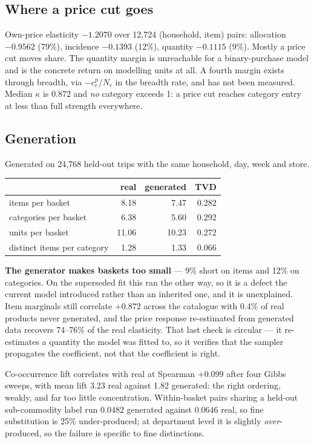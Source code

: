 \documentclass[11pt]{article}
\begin{document}
\subsection{Where a price cut goes}
\label{sec:decomp}

Own-price elasticity $-1.2070$ over 12{,}724 (household, item) pairs: allocation $-0.9562$
(79\%), incidence $-0.1393$ (12\%), quantity $-0.1115$ (9\%). Mostly a price cut moves
share. The quantity margin is unreachable for a binary-purchase model and is the concrete
return on modelling units at all. A fourth margin exists through breadth, via $-c^p_c/N_c$
in the breadth rate, and has not been measured. Median $\kappa$ is $0.872$ and \emph{no}
category exceeds 1: a price cut reaches category entry at less than full strength
everywhere.

\subsection{Generation}
\label{sec:gen}

Generated on 24{,}768 held-out trips with the same household, day, week and store.

\begin{center}
\begin{tabular}{lrrr}
\toprule
 & real & generated & TVD \\
\midrule
items per basket & 8.18 & 7.47 & 0.282 \\
categories per basket & 6.38 & 5.60 & 0.292 \\
units per basket & 11.06 & 10.23 & 0.272 \\
distinct items per category & 1.28 & 1.33 & 0.066 \\
\bottomrule
\end{tabular}
\end{center}

\textbf{The generator makes baskets too small} --- 9\% short on items and 12\% on categories.
On the superseded fit this ran the other way, so it is a defect the current model introduced
rather than an inherited one, and it is unexplained. Item marginals still correlate $+0.872$
across the catalogue with 0.4\% of real products never generated, and the price response
re-estimated from generated data recovers 74--76\% of the real elasticity. That last check is
circular --- it re-estimates a quantity the model was fitted to, so it verifies that the
sampler propagates the coefficient, not that the coefficient is right.

Co-occurrence lift correlates with real at Spearman $+0.099$ after four Gibbs sweeps, with
mean lift 3.23 real against 1.82 generated: the right ordering, weakly, and far too little
concentration. Within-basket pairs sharing a held-out sub-commodity label run $0.0482$
generated against $0.0646$ real, so fine substitution is 25\% under-produced; at department
level it is slightly \emph{over}-produced, so the failure is specific to fine distinctions.
\end{document}
